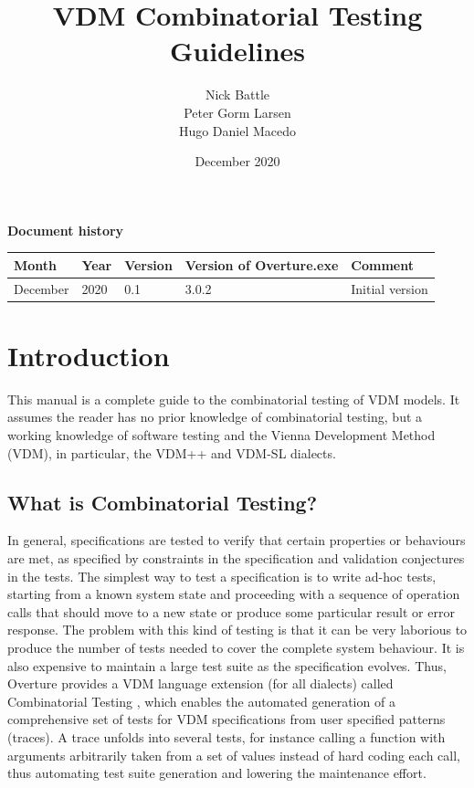 \documentclass{overturerepchap}
\begin{document}
\title{VDM Combinatorial Testing Guidelines}
\author{Nick Battle\\
            Peter Gorm Larsen\\
        Hugo Daniel Macedo}

\date{December 2020}

\maketitle


{\textbf{Document history}}

\begin{tabular}{|l|l|l|l|l|}\hline
Month   & Year & Version & Version of Overture.exe & Comment \\ \hline
December   & 2020 &    0.1     & 3.0.2   & Initial version\\ \hline
\end{tabular}

\tableofcontents
\newpage
\mbox{}
\newpage
{}
\setcounter{page}{1}

\chapter{Introduction}

This manual is a complete guide to the combinatorial testing of VDM models. It
assumes the reader has no prior knowledge of combinatorial testing, but a
working knowledge of software testing and the Vienna Development Method (VDM),
in particular, the VDM++ and VDM-SL dialects.

\section{What is Combinatorial Testing?}

In general, specifications are tested to verify that certain properties or
behaviours are met, as specified by constraints in the specification and
validation conjectures in the tests. 
%
The simplest way to test a specification is to write ad-hoc tests, starting
from a known system state and proceeding with a sequence of operation calls
that should move to a new state or produce some particular result or error
response.  The problem with this kind of testing is that it can be very
laborious to produce the number of tests needed to cover the complete system
behaviour. It is also expensive to maintain a large test suite as the
specification evolves. Thus, Overture provides a VDM language extension (for
all dialects) called Combinatorial Testing \cite{Nie&11,Larsen&10c}, which
enables the automated generation of a comprehensive set of tests for VDM
specifications from user specified patterns (traces). A trace unfolds into
several tests, for instance calling a function with arguments arbitrarily taken
from a set of values instead of hard coding each call,
thus automating test suite generation and lowering the maintenance effort.
\end{document}
